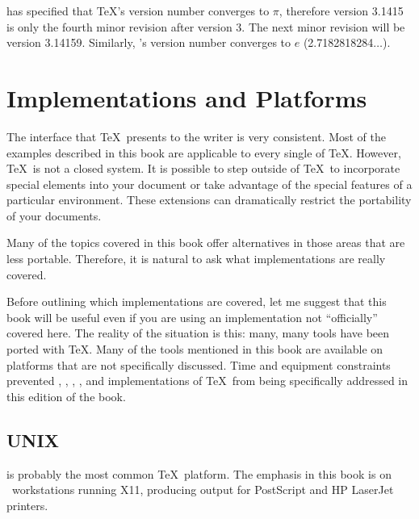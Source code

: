  has specified that \TeX's version number
converges to $\pi$, therefore version 3.1415 is only the fourth minor revision
after version 3.  The next minor revision will be version 3.14159.  Similarly,
\MF's version number converges to $e$ (2.7182818284$\ldots$).

\section{Implementations and Platforms}
\label{sec:implementation}

The interface that \TeX\ presents to the writer is very consistent.  Most of
the examples described in this book are applicable to every single
of \TeX.  However, \TeX\ is not a closed system.  It is possible to step
outside of \TeX\ to incorporate special elements into your document or take
advantage of the special features of a particular environment.  These
extensions can dramatically restrict the portability of your documents.

Many of the topics covered in this book offer alternatives in those areas that
are less portable.  Therefore, it is natural to ask what implementations
are really covered.

Before outlining which implementations are covered, let me suggest that this
book will be useful even if you are using an implementation not ``officially''
covered here.  The reality of the situation is this: many, many tools have
been ported with \TeX.  Many of the tools mentioned in this book are
available on platforms that are not specifically discussed.  
Time and equipment constraints prevented 
, 
, 
, 
, and
implementations of \TeX\ from being specifically addressed in this 
edition of the book.

\subsection{UNIX}

 is probably
the most common \TeX\ platform.  The emphasis in this book is on \Unix\
workstations running X11, producing output for PostScript and HP LaserJet
printers.

